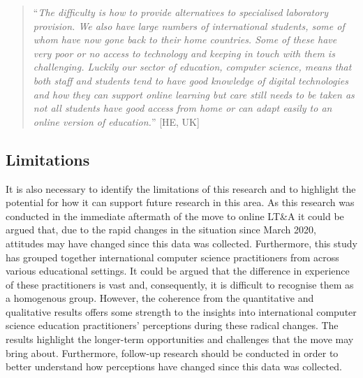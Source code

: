 \documentclass[conference]{IEEEtran}
\begin{document}

\begin{quotation}
``{\emph{The difficulty is how to provide alternatives to specialised
laboratory provision. We also have large numbers of international
students, some of whom have now gone back to their home
countries. Some of these have very poor or no access to technology and
keeping in touch with them is challenging. Luckily our sector of
education, computer science, means that both staff and students tend
to have good knowledge of digital technologies and how they can
support online learning but care still needs to be taken as not all
students have good access from home or can adapt easily to an online
version of education.}}'' [HE, UK]
\end{quotation}

\subsection{Limitations}

It is also necessary to identify the limitations of this research and
to highlight the potential for how it can support future research in
this area. As this research was conducted in the immediate aftermath
of the move to online LT\&A it could be argued that, due to the rapid
changes in the situation since March 2020, attitudes may have changed
since this data was collected. Furthermore, this study has grouped
together international computer science practitioners from across
various educational settings. It could be argued that the difference
in experience of these practitioners is vast and, consequently, it is
difficult to recognise them as a homogenous group. However, the
coherence from the quantitative and qualitative results offers some
strength to the insights into international computer science education
practitioners' perceptions during these radical changes. The results
highlight the longer-term opportunities and challenges that the move
may bring about. Furthermore, follow-up research should be conducted
in order to better understand how perceptions have changed since this
data was collected.
\end{document}
